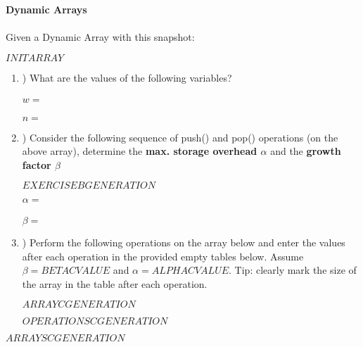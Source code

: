 
    \textbf{\LARGE{\color{tumgadPurple} Dynamic Arrays}}\\
    \\
    \noindent
    Given a Dynamic Array with this snapshot:
    \begin{center}
        $INITARRAY$
    \end{center}
    \begin{enumerate}[label=\alph*]
        \item \hspace{-5px}) What are the values of the following variables?\\
        \\
        $w = $\\
        \\
        $n = $
        \\
        \item \hspace{-5px}) Consider the following sequence of push() and pop() operations (on the above array), determine the \textbf{max. storage overhead $\alpha$}
        and the \textbf{growth factor $\beta$}
        \begin{center}
            $EXERCISEBGENERATION$
        \end{center}
        $\alpha = $\\
        \\
        $\beta = $\\
        \item \hspace{-5px}) Perform the following operations on the array below and enter the values after each operation in the provided empty
        tables below. Assume $\beta = BETACVALUE$ and $\alpha = ALPHACVALUE$. Tip: clearly mark the size of the array in the table after each operation.
        \begin{center}
            $ARRAYCGENERATION$
        \end{center}
        $OPERATIONSCGENERATION$
    \end{enumerate}
    \begin{center}
        $ARRAYSCGENERATION$
    \end{center}
